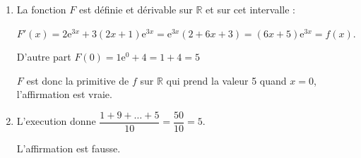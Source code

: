 \documentclass[10pt]{article}
\providecommand{\R}{\mathbb{R}}
\begin{document}
\begin{enumerate}
Le quotient a pour limite 1 et comme $\displaystyle\lim_{x \to + \infty}\text{e}^{x} = + \infty$, on a finalement $\displaystyle\lim_{x \to + \infty} \dfrac{\text{e}^{2x} - 1}{\text{e}^x - x} = +\infty$ : l'affirmation est fausse.

\item La fonction $F$ est définie et dérivable sur $\R$ et sur cet intervalle :

$F'(x) = 2\text{e}^{3x} + 3(2x + 1)\text{e}^{3x} = \text{e}^{3x}(2 + 6x + 3) = (6x + 5)\text{e}^{3x} = f(x)$.

D'autre part $F(0) = 1\text{e}^{0} + 4 = 1 + 4 = 5$

$F$ est donc la primitive de $f$ sur $\R$ qui prend la valeur 5 quand $x = 0$, l'affirmation est vraie.
\item L'execution donne $\dfrac{1 + 9 + \ldots + 5}{10} = \dfrac{50}{10} = 5$.

L'affirmation est fausse.
\end{enumerate}

\bigskip
\end{document}
